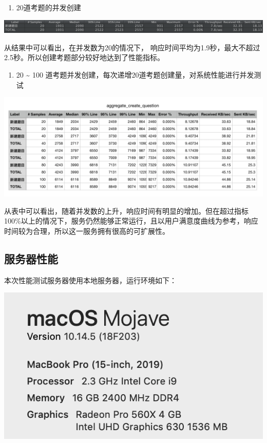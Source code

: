 \documentclass[hyperref, a4paper]{ctexart}
\providecommand{\tightlist}{%
  \setlength{\itemsep}{0pt}\setlength{\parskip}{0pt}}
\begin{document}
\begin{enumerate}
\def\labelenumi{\arabic{enumi}.}
\tightlist
\item
  20道考题的并发创建
\end{enumerate}

\includegraphics{resources/wcn/create_question_20.png}

从结果中可以看出，在并发数为20的情况下，
响应时间平均为1.9秒，最大不超过2.5秒。所以创建考题部分较好地达到了性能指标。

\begin{enumerate}
\def\labelenumi{\arabic{enumi}.}
\setcounter{enumi}{1}
\tightlist
\item
  20 \textasciitilde{} 100
  道考题并发创建，每次递增20道考题创建量，对系统性能进行并发测试
\end{enumerate}

\includegraphics{resources/wcn/create_question_aggregate.png}

从表中可以看出，随着并发数的上升，响应时间有明显的增加。但在超过指标100\%以上的情况下，服务仍然能够正常运行，且以用户满意度曲线为参考，响应时间较为合理，所以这一服务拥有很高的可扩展性。

\hypertarget{ux670dux52a1ux5668ux6027ux80fd}{%
\subsection{服务器性能}\label{ux670dux52a1ux5668ux6027ux80fd}}

本次性能测试服务器使用本地服务器，运行环境如下：

\includegraphics{resources/wcn/environment.png}
\end{document}
